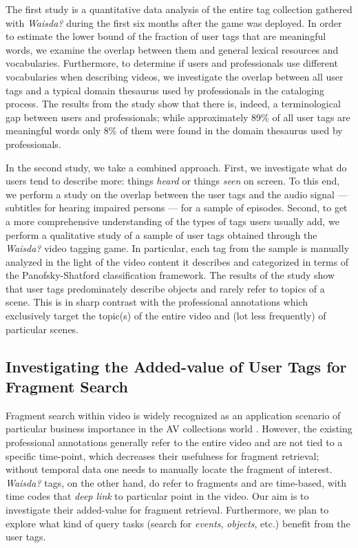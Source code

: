 The first study is a quantitative data analysis of the entire tag collection gathered with \textit{Waisda?} during the first six months after the game was deployed. In order to estimate the lower bound of the fraction of user tags that are meaningful words, we examine the overlap between them and general lexical resources and vocabularies. Furthermore, to determine if users and professionals use different vocabularies when describing videos, we investigate the overlap between all user tags and a typical domain thesaurus used by professionals in the cataloging process. The results from the study show that there is, indeed, a terminological gap between users and professionals; while approximately 89\% of all user tags are meaningful words only 8\% of them were found in the domain thesaurus used by professionals.

In the second study, we take a combined approach. First, we investigate what do users tend to describe  more: things \textit{heard} or things \textit{seen} on screen. To this end, we perform a study on the overlap between the user tags and the audio signal --- subtitles for hearing impaired persons --- for a sample of episodes. Second, to get a more comprehensive understanding of the types of tags users usually add, we perform a qualitative study of a sample of user tags obtained through the \textit{Waisda?} video tagging game. In particular, each tag from the sample is manually analyzed in the light of the video content it describes and categorized in terms of the Panofsky-Shatford classification framework. The results of the study show that user tags predominately describe objects and rarely refer to topics of a scene. This is in sharp contrast with the professional annotations which  exclusively target the topic(s) of the entire video and (lot less frequently) of particular scenes. 


\subsection{Investigating the Added-value of User Tags for Fragment Search}\label{sec:fragment-search}
Fragment search within video is widely recognized as an application scenario of particular business importance in the AV collections world \cite{fragmentpercent}. However, the existing professional annotations generally refer to the entire video and are not tied to a specific time-point, which decreases their usefulness for fragment retrieval; without temporal data one needs to manually locate the fragment of interest. \textit{Waisda?} tags, on the other hand, do refer to fragments and are time-based, with time codes that \textit{deep link} to particular point in the video. Our aim is to investigate their added-value for fragment retrieval. Furthermore, we plan to explore what kind of query tasks (search for \textit{events}, \textit{objects}, etc.)  benefit from the user tags.

